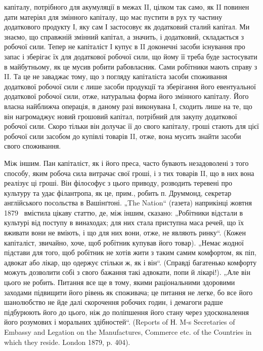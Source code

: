 \parcont{}  %
капіталу, потрібного для акумуляції в межах II, цілком так само, як II
повинен дати матеріял для змінного капіталу, що має пустити в рух ту
частину додаткового продукту І, яку сам І застосовує як додатковий
сталий капітал. Ми знаємо, що справжній змінний капітал, а значить, і
додатковий, складається з робочої сили. Тепер не капіталіст І купує в II
доконечні засоби існування про запас і зберігає їх для додаткової робочої
сили, що йому її треба буде застосувати в майбутньому, як це
мусив робити рабовласник. Сами робітники мають справу з II. Та це не
заваджає тому, що з погляду капіталіста засоби споживання додаткової
робочої сили є лише засоби продукції та зберігання його евентуальної
додаткової робочої сили, отже, натуральна форма його змінного капіталу.
Його власна найближча операція, в даному разі виконувана І, сходить
лише на те, що він нагромаджує новий грошовий капітал, потрібний для
закупу додаткової робочої сили. Скоро тільки він долучає її до свого
капіталу, гроші стають для цієї робочої сили засобом до купівлі
товарів II, отже, вона мусить знайти засоби свого споживання.

Між іншим. Пан капіталіст, як і його преса, часто бувають незадоволені
з того способу, яким робоча сила витрачає свої гроші, і з
тих товарів II, що в них вона реалізує ці гроші. Він філософує з цього
приводу, розводить теревені про культуру та удає філантропа, як це,
прим., робить п. Друммонд, секретар англійського посольства в Вашінґтоні.
„The Nation“ (газета) наприкінці жовтня 1879~ вмістила цікаву
статтю, де, між іншим, сказано: „Робітники відстали в культурі від поступу
в винаходах; для них стала приступна маса речей, що їх вживати
вони не вміють, і що для них вони, отже, не являють ринку“.
(Кожен капіталіст, звичайно, хоче, щоб робітник купував його товар).
„Немає жодної підстави для того, щоб робітник не хотів жити з таким
самим комфортом, як піп, адвокат або лікар, що одержує стільки ж, як
і він“. (Справді багатенько комфорту можуть дозволити собі з свого бажання
такі адвокати, попи й лікарі!). „Але він цього не робить. Питання
все ще в тому, якими раціональними здоровими заходами підвищити його
рівень як споживача; це питання не легке, бо все його шанолюбство не
йде далі скорочення робочих годин, і демагоги радше підбурюють його
до цього, ніж до поліпшення його стану через удосконалення його розумових
і моральних здібностей“. (Reports of Н. M-s Secretaries of Embassy
and Legation on the Manufactures, Commerce etc. of the Countries in
which they reside. London 1879, p. 404).

